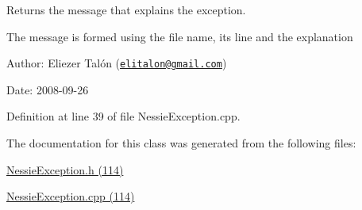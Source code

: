 Returns the message that explains the exception. 

The message is formed using the file name, its line and the explanation

\begin{Desc}
\item[Author:]Eliezer Talón (\href{mailto:elitalon@gmail.com}{\tt elitalon@gmail.com}) \end{Desc}
\begin{Desc}
\item[Date:]2008-09-26 \end{Desc}


Definition at line 39 of file NessieException.cpp.

The documentation for this class was generated from the following files:\begin{CompactItemize}
\item 
\hyperlink{_nessie_exception_8h}{NessieException.h (114)}\item 
\hyperlink{_nessie_exception_8cpp}{NessieException.cpp (114)}\end{CompactItemize}

